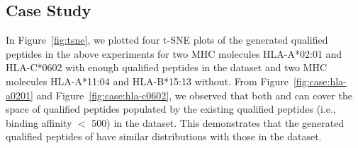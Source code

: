\documentclass[letterpaper]{article}
\begin{document}
\subsection{Case Study}
\label{sec:results:case_study}

In Figure~\ref{fig:tsne}, we plotted four t-SNE plots of the generated qualified peptides in the above experiments for two MHC molecules HLA-A*02:01 and HLA-C*0602 with enough 
qualified peptides in the dataset and two MHC molecules HLA-A*11:04 and HLA-B*15:13 without.
%
From Figure~\ref{fig:case:hla-a0201} and Figure~\ref{fig:case:hla-c0602}, we observed that both \pwm and \pepppo can cover the space of qualified peptides populated by the existing 
qualified peptides (i.e., binding affinity $<$ 500) in the dataset.
%
This demonstrates that the generated qualified peptides of \pepppo have similar distributions with those in the dataset.
\end{document}
